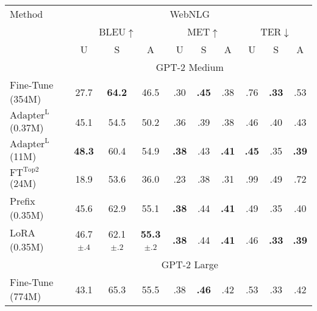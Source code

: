 \begin{table}[h]
\centering
\begin{tabular}{l|ccc|ccc|ccc}
\hline
\toprule
Method & \multicolumn{9}{c}{WebNLG} \\ %
       & \multicolumn{3}{c}{BLEU$\uparrow$}  &  \multicolumn{3}{c}{MET$\uparrow$} & \multicolumn{3}{c}{TER$\downarrow$ } \\
       & U & S & A & U & S & A & U & S & A \\
\midrule
&  \multicolumn{9}{c}{GPT-2 Medium}\\
Fine-Tune (354M)                    & 27.7                                  & \textbf{64.2}                         & 46.5                                  & .30           & \textbf{.45}  & .38           &.76            & \textbf{.33}           & .53  \\
$\text{Adapter}^{\text{L}}$ (0.37M)  & 45.1                                  & 54.5                                  & 50.2                                  & .36           & .39           & .38           & .46           & .40           & .43 \\
$\text{Adapter}^{\text{L}}$ (11M)   & \textbf{48.3}                         & 60.4                                  & 54.9                                  & \textbf{.38}  & .43           & \textbf{.41}  & \textbf{.45}  & .35           &  \textbf{.39} \\
$\text{FT}^{\text{Top2}}$ (24M)     & 18.9                                  & 53.6                                  & 36.0                                  & .23           & .38           & .31           & .99          & .49           & .72 \\
Prefix (0.35M)                      & 45.6                                  & 62.9                                  & 55.1                                  & \textbf{.38}  & .44           & \textbf{.41}  & .49           & .35           & .40   \\
LoRA (0.35M)                        & 46.7\textsubscript{$\pm$.4}           & 62.1\textsubscript{$\pm$.2}           & \textbf{55.3}\textsubscript{$\pm$.2}  & \textbf{.38}  & .44           & \textbf{.41}  & .46           & \textbf{.33}  & \textbf{.39} \\
\midrule
& \multicolumn{9}{c}{GPT-2 Large}\\
Fine-Tune (774M)                    & 43.1                                  & 65.3                                  & 55.5                                  & .38           & \textbf{.46}  & .42           & .53           & .33           & .42  \\

\end{tabular}
\end{table}
